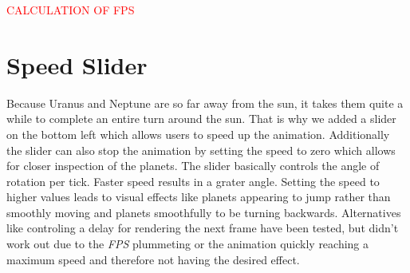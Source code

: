 \textcolor{red}{CALCULATION OF FPS}

\section{Speed Slider}
Because Uranus and Neptune are so far away from the sun, it takes them quite a while to complete an entire turn around the sun. That is why we added a slider on the bottom left which allows users to speed up the animation. Additionally the slider can also stop the animation by setting the speed to zero which allows for closer inspection of the planets. The slider basically controls the angle of rotation per tick. Faster speed results in a grater angle. Setting the speed to higher values leads to visual effects like planets appearing to jump rather than smoothly moving and planets smoothfully to be turning backwards. Alternatives like controling a delay for rendering the next frame have been tested, but didn't work out due to the {\em FPS} plummeting or the animation quickly reaching a maximum speed and therefore not having the desired effect.
